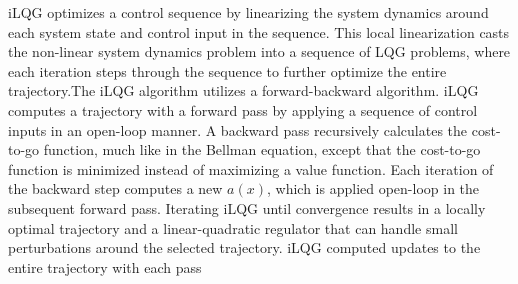 \documentclass[12pt]{article}
\begin{document}
            \begin{figure}
                \centering
            \end{figure}

            \par iLQG optimizes a control sequence by linearizing the system dynamics around each system state and control input in the sequence. This local linearization casts the non-linear system dynamics problem into a sequence of LQG problems, where each iteration steps through the sequence to further optimize the entire trajectory.The iLQG algorithm utilizes a forward-backward algorithm. iLQG computes a trajectory with a forward pass by applying a sequence of control inputs in an open-loop manner. A backward pass recursively calculates the cost-to-go function, much like in the Bellman equation, except that the cost-to-go function is minimized instead of maximizing a value function. Each iteration of the backward step computes a new $a(x)$, which is applied open-loop in the subsequent forward pass. Iterating iLQG until convergence results in a locally optimal trajectory and a linear-quadratic regulator that can handle small perturbations around the selected trajectory.\cite{todorov_generalized_2005} iLQG computed updates to the entire trajectory with each pass
\end{document}
